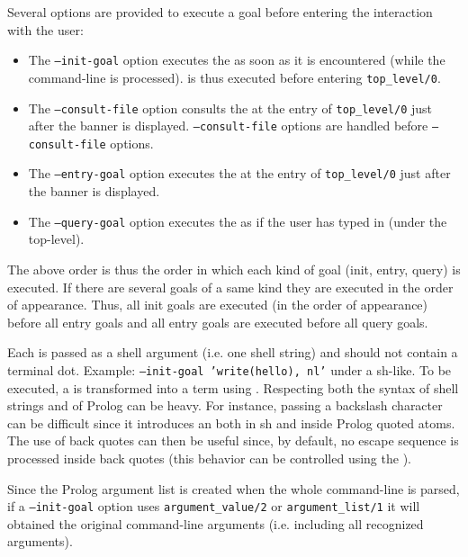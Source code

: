 Several options are provided to execute a goal before entering the
interaction with the user:

\begin{itemize}

\item The \texttt{--init-goal} option executes the  as soon as
it is encountered (while the command-line is processed).  is thus
executed before entering \texttt{top\_level/0}.

\item The \texttt{--consult-file} option consults the  at the
entry of \texttt{top\_level/0} just after the banner is displayed. 
\texttt{--consult-file} options are handled before \texttt{--consult-file} options.

\item The \texttt{--entry-goal} option executes the  at the
entry of \texttt{top\_level/0} just after the banner is displayed.

\item The \texttt{--query-goal} option executes the  as if the
user has typed in (under the top-level).

\end{itemize}

The above order is thus the order in which each kind of goal (init, entry,
query) is executed.  If there are several goals of a same kind they are
executed in the order of appearance. Thus, all init goals are executed (in the
order of appearance) before all entry goals and all entry goals are executed
before all query goals.

Each  is passed as a shell argument (i.e. one shell string) and
should not contain a terminal dot. Example:
\texttt{--init-goal 'write(hello), nl'} under a sh-like.
To be executed, a  is transformed into a term using
. Respecting both
the syntax of shell strings and of Prolog can be heavy. For
instance, passing a backslash character \texttt{{\bs}} can be difficult
since it introduces an  both in sh and inside Prolog
quoted atoms. The use of back quotes can then be useful since, by default, no
escape sequence is processed inside back quotes (this behavior can be
controlled using the   ).


Since the Prolog argument list is created when the whole command-line is
parsed, if a \texttt{--init-goal} option uses \texttt{argument\_value/2} or
\texttt{argument\_list/1} it will obtained the original command-line
arguments (i.e. including all recognized arguments).

